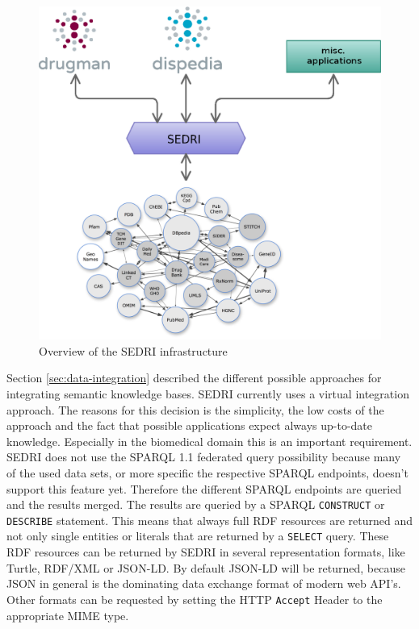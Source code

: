 \begin{figure}
  \centering
  \includegraphics[scale=0.7]{methods/wrapper2.eps}
  \caption{Overview of the SEDRI infrastructure}
  \label{fig:arch_sedri}
\end{figure}
Section \ref{sec:data-integration} described the different possible approaches for integrating semantic knowledge bases.
SEDRI currently uses a virtual integration approach.
The reasons for this decision is the simplicity, the low costs of the approach and the fact that possible applications expect always up-to-date knowledge.
Especially in the biomedical domain this is an important requirement.
SEDRI does not use the SPARQL 1.1 federated query possibility because many of the used data sets, or more specific the respective SPARQL endpoints, doesn't support this feature yet.
Therefore the different SPARQL endpoints are queried and the results merged.
The results are queried by a SPARQL \texttt{CONSTRUCT} or \texttt{DESCRIBE} statement.
This means that always full RDF resources are returned and not only single entities or literals that are returned by a \texttt{SELECT} query.
These RDF resources can be returned by SEDRI in several representation formats, like Turtle, RDF/XML or JSON-LD.
By default JSON-LD will be returned, because JSON in general is the dominating data exchange format of modern web API's.
Other formats can be requested by setting the HTTP \texttt{Accept} Header to the appropriate MIME type.

